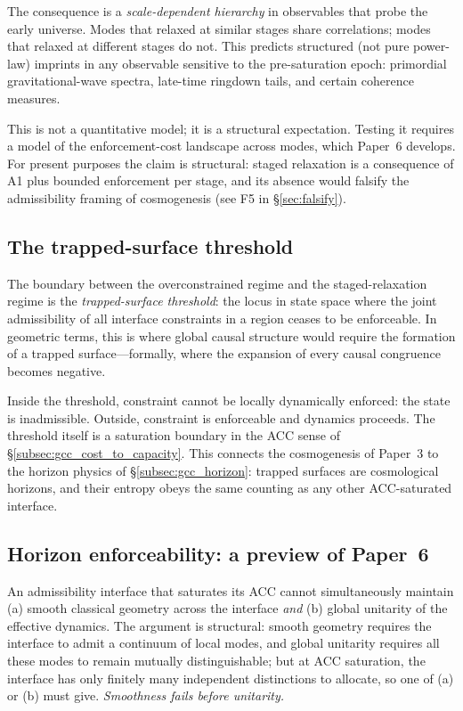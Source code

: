 \documentclass[11pt]{article}
\begin{document}
The consequence is a \emph{scale-dependent hierarchy} in observables that
probe the early universe.  Modes that relaxed at similar stages share
correlations; modes that relaxed at different stages do not.  This
predicts structured (not pure power-law) imprints in any observable
sensitive to the pre-saturation epoch: primordial gravitational-wave
spectra, late-time ringdown tails, and certain coherence measures.

This is not a quantitative model; it is a structural expectation.  Testing
it requires a model of the enforcement-cost landscape across modes, which
Paper~6 develops.  For present purposes the claim is structural: staged
relaxation is a consequence of A1 plus bounded enforcement per stage, and
its absence would falsify the admissibility framing of cosmogenesis (see
F5 in \S\ref{sec:falsify}).

\subsection{The trapped-surface threshold}
\label{subsec:cos_trapped}

The boundary between the overconstrained regime and the staged-relaxation
regime is the \emph{trapped-surface threshold}: the locus in state space
where the joint admissibility of all interface constraints in a region
ceases to be enforceable.  In geometric terms, this is where global causal
structure would require the formation of a trapped surface---formally,
where the expansion of every causal congruence becomes negative.

Inside the threshold, constraint cannot be locally dynamically enforced:
the state is inadmissible.  Outside, constraint is enforceable and
dynamics proceeds.  The threshold itself is a saturation boundary in the
ACC sense of \S\ref{subsec:gcc_cost_to_capacity}.  This connects the
cosmogenesis of Paper~3 to the horizon physics of \S\ref{subsec:gcc_horizon}:
trapped surfaces are cosmological horizons, and their entropy obeys the
same counting as any other ACC-saturated interface.

\subsection{Horizon enforceability: a preview of Paper~6}
\label{subsec:cos_horizon_preview}

An admissibility interface that saturates its ACC cannot simultaneously
maintain (a) smooth classical geometry across the interface \emph{and}
(b) global unitarity of the effective dynamics.  The argument is
structural: smooth geometry requires the interface to admit a continuum of
local modes, and global unitarity requires all these modes to remain
mutually distinguishable; but at ACC saturation, the interface has only
finitely many independent distinctions to allocate, so one of (a) or (b)
must give.  \emph{Smoothness fails before unitarity.}
\end{document}
